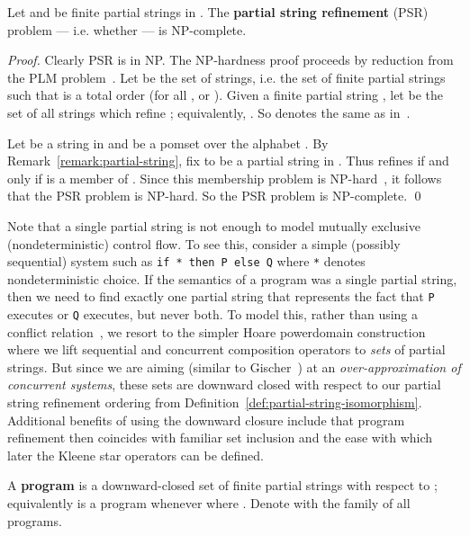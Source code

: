 \documentclass{llncs}
\newcommand{\defn}[1]{\textbf{#1}}
\begin{document}
\begin{proposition}
\label{proposition:psr-NP-complete}
Let  and  be finite partial strings in . The \defn{partial string refinement} (PSR) problem --- i.e. whether  --- is NP-complete.
\end{proposition}
\begin{proof}
Clearly \textsc{PSR} is in NP. The NP-hardness proof proceeds by reduction from the PLM problem~\cite{FKL1993}. Let  be the set of strings, i.e. the set of finite partial strings  such that  is a total order (for all ,  or ). Given a finite partial string , let  be the set of all strings which refine ; equivalently, . So  denotes the same as  in~\cite[Definition 2.2]{FKL1993}.

Let  be a string in  and  be a pomset over the alphabet . By Remark~\ref{remark:partial-string}, fix  to be a partial string in . Thus  refines  if and only if  is a member of . Since this membership problem is NP-hard~\cite[Theorem 4.1]{FKL1993}, it follows that the \textsc{PSR} problem is NP-hard. So the \textsc{PSR} problem is NP-complete. \qed
\end{proof}

Note that a single partial string is not enough to model mutually exclusive (nondeterministic) control flow. To see this, consider a simple (possibly sequential) system such as \texttt{if * then P else Q} where \texttt{*} denotes nondeterministic choice. If the semantics of a program was a single partial string, then we need to find exactly one partial string that represents the fact that \texttt{P} executes or \texttt{Q} executes, but never both. To model this, rather than using a conflict relation~\cite{NPW1981}, we resort to the simpler Hoare powerdomain construction where we lift sequential and concurrent composition operators to \emph{sets} of partial strings. But since we are aiming (similar to Gischer~\cite{G1988}) at an \emph{over-approximation of concurrent systems}, these sets are downward closed with respect to our partial string refinement ordering from Definition~\ref{def:partial-string-isomorphism}. Additional benefits of using the downward closure include that program refinement then coincides with familiar set inclusion and the ease with which later the Kleene star operators can be defined.

\begin{definition}[Program]
\label{def:program}
A \defn{program} is a downward-closed set of finite partial strings with respect to ; equivalently  is a program whenever  where . Denote with  the family of all programs.
\end{definition}
\end{document}
